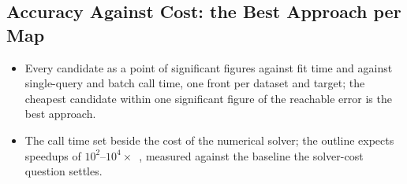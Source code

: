 \subsection{Accuracy Against Cost: the Best Approach per Map}
\label{sec:budget}

\begin{itemize}
  \item Every candidate as a point of significant figures against fit time and against single-query and batch call time, one front per dataset and target; the cheapest candidate within one significant figure of the reachable error is the best approach.
  \item The call time set beside the cost of the numerical solver; the outline expects speedups of $10^2$--$10^4\times$~\citep{Liodis2024,Kaushikk2026,Reed2024}, measured against the baseline the solver-cost question settles.
\end{itemize}
